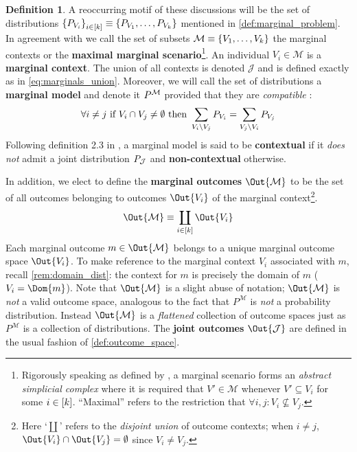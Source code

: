 \documentclass[aps, 10pt, english, twoside, pra, nofootinbib, longbibliography]{revtex4-1}
\theoremstyle{plain}
\theoremstyle{definition}
\newtheorem{definition}[theorem]{Definition}
\theoremstyle{remark}
\newcommand{\mscenario}{\mathcal{M}}
\newcommand{\jointvar}{\mathcal{J}}
\newcommand{\term}[1]{\textcolor{Mahogany}{\textbf{#1}}}
\newcommand{\outc}[1]{o\bs{#1}} %
\begin{document}
    \begin{definition}
        \label{def:marginal_model}
        A reoccurring motif of these discussions will be the set of distributions $\bc{\prob[V_{i}]}_{i \in \bs{k}} \defined \bc{\prob[V_1], \ldots, \prob[V_k]}$ mentioned in \cref{def:marginal_problem}. In agreement with \cite{Fritz_2011} we call the set of subsets $\mscenario \defined \bc{V_1, \ldots, V_k}$ the marginal contexts or the \term{maximal marginal scenario}\footnote{Rigorously speaking as defined by \cite{Fritz_2011}, a marginal scenario forms an \textit{abstract simplicial complex} where it is required that $V' \in \mscenario$ whenever $V' \subseteq V_i$ for some $i \in \bs{k}$. ``Maximal'' refers to the restriction that $\forall i,j : V_i \not \subseteq V_j$.}. An individual $V_i \in \mscenario$ is a \term{marginal context}. The union of all contexts is denoted $\jointvar$ and is defined exactly as in \cref{eq:marginals_union}.
        Moreover, we will call the set of distributions a \term{marginal model} and denote it $\prob^{\mscenario}$ provided that they are \textit{compatible} :
        \[ \forall i \neq j \text{ if } V_i \cap V_j \neq \emptyset \text{ then } \sum_{V_i \setminus V_j} \prob[V_i] = \sum_{V_j \setminus V_i} \prob[V_j]  \]
        Following definition 2.3 in \cite{Fritz_2011}, a marginal model is said to be \term{contextual} if it \textit{does not} admit a joint distribution $\prob[\jointvar]$ and \term{non-contextual} otherwise.

        In addition, we elect to define the \term{marginal outcomes} $\Out{\mscenario}$ to be the set of all outcomes belonging to outcomes $\Out{V_i}$ of the marginal context\footnote{Here `$\coprod$' refers to the \textit{disjoint union} of outcome contexts; when $i \neq j$, $\Out{V_i} \cap \Out{V_j} = \emptyset$ since $V_i \neq V_j$.}.
        \[ \Out{\mscenario} \defined \coprod_{i \in \bs{k}} \Out{V_i} \]
        Each marginal outcome $m \in \Out{\mscenario}$ belongs to a unique marginal outcome space $\Out{V_i}$. To make reference to the marginal context $V_i$ associated with $m$, recall \cref{rem:domain_dist}: the context for $m$ is precisely the domain of $m$ ($V_i = \Dom{m}$). Note that $\Out{\mscenario}$ is a slight abuse of notation; $\Out{\mscenario}$ is \textit{not} a valid outcome space, analogous to the fact that $P^{\mscenario}$ is \textit{not} a probability distribution. Instead $\Out{\mscenario}$ is a \textit{flattened} collection of outcome spaces just as $P^{\mscenario}$ is a collection of distributions. The \term{joint outcomes} $\Out{\jointvar}$ are defined in the usual fashion of \cref{def:outcome_space}.
    \end{definition}
\end{document}
